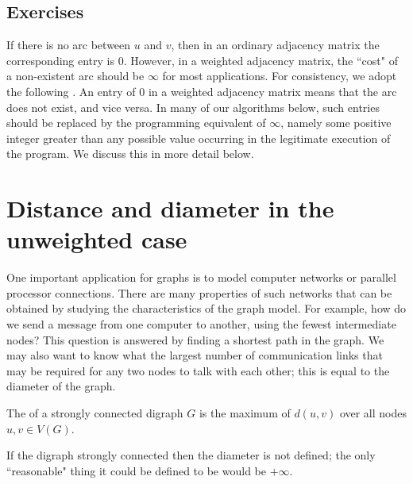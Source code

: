 \subsection*{Exercises}


\begin{Exercise} \label{ex:0-vs-infty}

If there is no arc between $u$ and $v$, then in an ordinary adjacency
matrix the corresponding entry is $0$. However, in a weighted adjacency
matrix, the ``cost" of a non-existent arc should be $\infty$ for most
applications. For consistency, we adopt the following
. An entry of $0$ in a weighted adjacency matrix
means that the arc does not exist, and vice versa. In many of our
algorithms below, such entries should be replaced by the programming
equivalent of $\infty$, namely some positive integer greater than any
possible value occurring in the legitimate execution of the program. We
discuss this in more detail below.
\end{Exercise}


\section{Distance and diameter in the unweighted
case}\label{sec:unweighted}

One important application for graphs is to model computer networks or
parallel processor connections.  There are many properties of such
networks that can be obtained by studying the characteristics of the
graph model. For example, how do we send a message from one computer to
another, using the fewest intermediate nodes? This question is answered
by finding a shortest path in the graph.  We may also want to know what
the largest number of communication links that may be required for any
two nodes to talk with each other; this is equal to the diameter of
the graph.

\begin{Definition}\label{def:diameter}

The  of a strongly connected digraph $G$ is the
maximum
of $d(u,v)$ over all nodes $u, v\in V(G)$.

\end{Definition}

\begin{note} If the digraph strongly connected then the
diameter is not defined; the only ``reasonable" thing it could be
defined to be would be $+\infty$.
\end{note}

